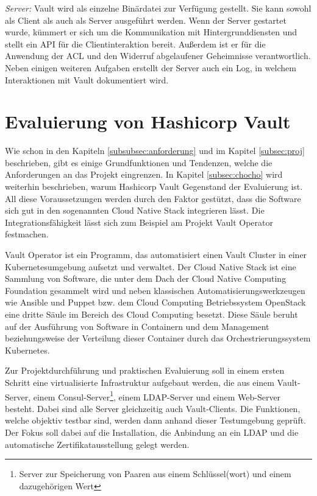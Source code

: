 \documentclass[
book,
a4paper,   
titlepage,  
halfparskip,
12pt        
]{scrartcl}
\begin{document}
\begin{onehalfspacing}
\textit{Server:} Vault wird als einzelne Binärdatei zur Verfügung gestellt. Sie kann sowohl als Client als auch als Server ausgeführt werden. Wenn der Server gestartet wurde, kümmert er sich um die Kommunikation mit Hintergrunddiensten und stellt ein \ac{API} für die Clientinteraktion bereit. Außerdem ist er für die Anwendung der \ac{ACL} und den Widerruf abgelaufener Geheimnisse verantwortlich. Neben einigen weiteren Aufgaben erstellt der Server auch ein Log, in welchem Interaktionen mit Vault dokumentiert wird.

\newpage
\section{Evaluierung von Hashicorp Vault}
 
\label{subsec:anf}
Wie schon in den Kapiteln \vref{subsubsec:anforderung} und im Kapitel \vref{subsec:proj} beschrieben, gibt es einige Grundfunktionen und Tendenzen, welche die Anforderungen an das Projekt eingrenzen. In Kapitel \vref{subsec:chocho} wird weiterhin beschrieben, warum Hashicorp Vault Gegenstand der Evaluierung ist. All diese Voraussetzungen werden durch den Faktor gestützt, dass die Software sich gut in den sogenannten Cloud Native Stack integrieren lässt\cite{cncf}. Die Integrationsfähigkeit lässt sich zum Beispiel am Projekt Vault Operator festmachen\cite{operator}.

Vault Operator ist ein Programm, das automatisiert einen Vault Cluster in einer Kubernetesumgebung aufsetzt und verwaltet. Der Cloud Native Stack ist eine Sammlung von Software, die unter dem Dach der Cloud Native Computing Foundation gesammelt wird und neben klassischen Automatisierungswerkzeugen wie Ansible und Puppet bzw. dem Cloud Computing Betriebssystem OpenStack eine dritte Säule im Bereich des Cloud Computing besetzt. Diese Säule beruht auf der Ausführung von Software in Containern und dem Management beziehungsweise der Verteilung dieser Container durch das Orchestrierungssystem Kubernetes.

Zur Projektdurchführung und praktischen Evaluierung soll in einem ersten Schritt eine virtualisierte Infrastruktur aufgebaut werden, die aus einem Vault-Server, einem Consul-Server\footnote{Server zur Speicherung von Paaren aus einem Schlüssel(wort) und einem dazugehörigen Wert}, einem \acs{LDAP}-Server und einem Web-Server besteht. Dabei sind alle Server gleichzeitig auch Vault-Clients. Die Funktionen, welche objektiv testbar sind, werden dann anhand dieser Testumgebung geprüft. Der Fokus soll dabei auf die Installation,  die Anbindung an ein \ac{LDAP} und die automatische Zertifikatausstellung gelegt werden.


\end{onehalfspacing}
\end{document}
